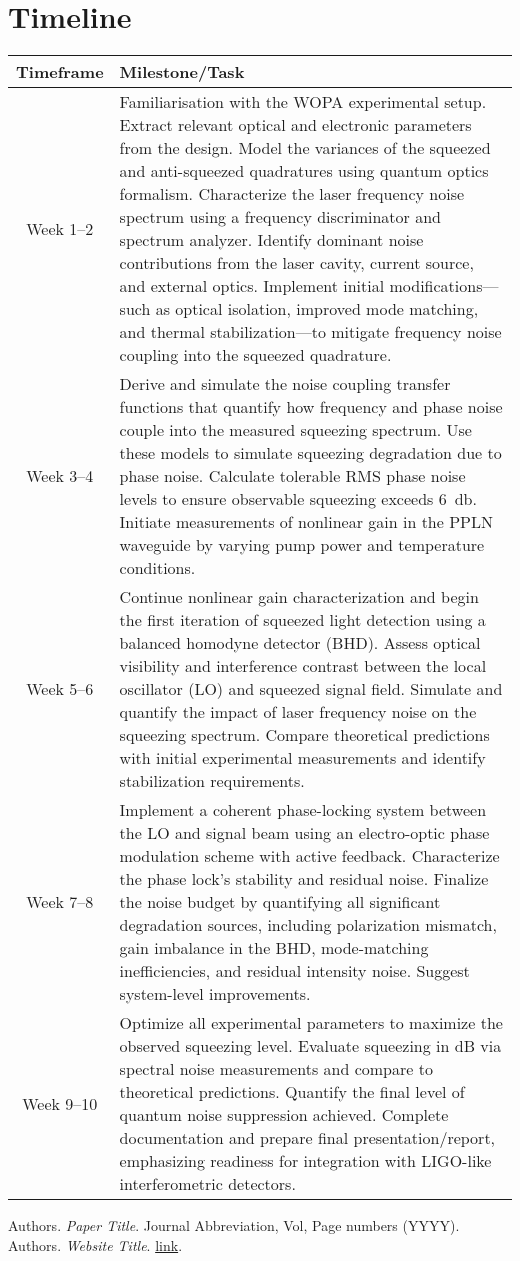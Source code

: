 \documentclass[colorlinks=true,pdfstartview=FitV,linkcolor=blue,
citecolor=red,urlcolor=magenta]{ligodoc}
\begin{document}
 \section{Timeline}
\begin{longtable}{|c|p{11cm}|}
\hline
\textbf{Timeframe} & \textbf{Milestone/Task} \\
\hline
Week 1--2 & Familiarisation with the WOPA experimental setup. Extract relevant optical and electronic parameters from the design. Model the variances of the squeezed and anti-squeezed quadratures using quantum optics formalism. Characterize the laser frequency noise spectrum using a frequency discriminator and spectrum analyzer. Identify dominant noise contributions from the laser cavity, current source, and external optics. Implement initial modifications—such as optical isolation, improved mode matching, and thermal stabilization—to mitigate frequency noise coupling into the squeezed quadrature. \\
\hline
Week 3--4 & Derive and simulate the noise coupling transfer functions that quantify how frequency and phase noise couple into the measured squeezing spectrum. Use these models to simulate squeezing degradation due to phase noise. Calculate tolerable RMS phase noise levels to ensure observable squeezing exceeds \SI{6}{\decibel}. Initiate measurements of nonlinear gain in the PPLN waveguide by varying pump power and temperature conditions. \\
\hline
Week 5--6 & Continue nonlinear gain characterization and begin the first iteration of squeezed light detection using a balanced homodyne detector (BHD). Assess optical visibility and interference contrast between the local oscillator (LO) and squeezed signal field. Simulate and quantify the impact of laser frequency noise on the squeezing spectrum. Compare theoretical predictions with initial experimental measurements and identify stabilization requirements. \\
\hline
Week 7--8 & Implement a coherent phase-locking system between the LO and signal beam using an electro-optic phase modulation scheme with active feedback. Characterize the phase lock's stability and residual noise. Finalize the noise budget by quantifying all significant degradation sources, including polarization mismatch, gain imbalance in the BHD, mode-matching inefficiencies, and residual intensity noise. Suggest system-level improvements. \\
\hline
Week 9--10 & Optimize all experimental parameters to maximize the observed squeezing level. Evaluate squeezing in dB via spectral noise measurements and compare to theoretical predictions. Quantify the final level of quantum noise suppression achieved. Complete documentation and prepare final presentation/report, emphasizing readiness for integration with LIGO-like interferometric detectors. \\
\hline
\end{longtable}



\begin{thebibliography}{9}
 Authors. \emph{Paper Title}. Journal Abbreviation, Vol, Page numbers (YYYY).
 Authors. \emph{Website Title}. \url{link}.

\end{thebibliography}
\end{document}
